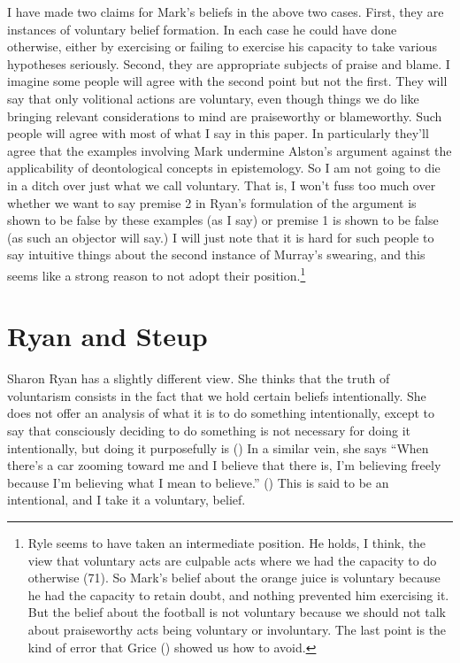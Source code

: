\documentclass[
  10pt,
  letterpaper,
  DIV=11,
  numbers=noendperiod,
  twoside]{scrartcl}
\begin{document}
I have made two claims for Mark's beliefs in the above two cases. First,
they are instances of voluntary belief formation. In each case he could
have done otherwise, either by exercising or failing to exercise his
capacity to take various hypotheses seriously. Second, they are
appropriate subjects of praise and blame. I imagine some people will
agree with the second point but not the first. They will say that only
volitional actions are voluntary, even though things we do like bringing
relevant considerations to mind are praiseworthy or blameworthy. Such
people will agree with most of what I say in this paper. In particularly
they'll agree that the examples involving Mark undermine Alston's
argument against the applicability of deontological concepts in
epistemology. So I am not going to die in a ditch over just what we call
voluntary. That is, I won't fuss too much over whether we want to say
premise 2 in Ryan's formulation of the argument is shown to be false by
these examples (as I say) or premise 1 is shown to be false (as such an
objector will say.) I will just note that it is hard for such people to
say intuitive things about the second instance of Murray's swearing, and
this seems like a strong reason to not adopt their position.\footnote{Ryle
  seems to have taken an intermediate position. He holds, I think, the
  view that voluntary acts are culpable acts where we had the capacity
  to do otherwise (71). So Mark's belief about the orange juice is
  voluntary because he had the capacity to retain doubt, and nothing
  prevented him exercising it. But the belief about the football is not
  voluntary because we should not talk about praiseworthy acts being
  voluntary or involuntary. The last point is the kind of error that
  Grice () showed us how to avoid.}

\section{Ryan and Steup}\label{ryan-and-steup}

Sharon Ryan has a slightly different view. She thinks that the truth of
voluntarism consists in the fact that we hold certain beliefs
intentionally. She does not offer an analysis of what it is to do
something intentionally, except to say that consciously deciding to do
something is not necessary for doing it intentionally, but doing it
purposefully is () In a
similar vein, she says ``When there's a car zooming toward me and I
believe that there is, I'm believing freely because I'm believing what I
mean to believe.'' () This is said
to be an intentional, and I take it a voluntary, belief.
\end{document}
